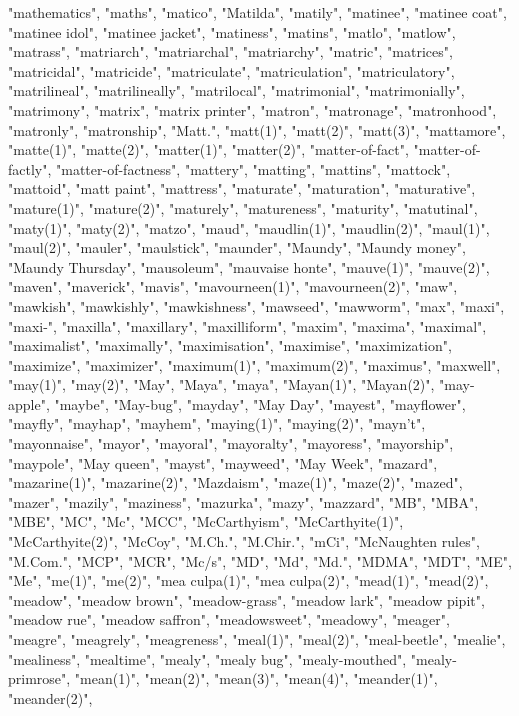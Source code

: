 "mathematics",
"maths",
"matico",
"Matilda",
"matily",
"matinee",
"matinee coat",
"matinee idol",
"matinee jacket",
"matiness",
"matins",
"matlo",
"matlow",
"matrass",
"matriarch",
"matriarchal",
"matriarchy",
"matric",
"matrices",
"matricidal",
"matricide",
"matriculate",
"matriculation",
"matriculatory",
"matrilineal",
"matrilineally",
"matrilocal",
"matrimonial",
"matrimonially",
"matrimony",
"matrix",
"matrix printer",
"matron",
"matronage",
"matronhood",
"matronly",
"matronship",
"Matt.",
"matt(1)",
"matt(2)",
"matt(3)",
"mattamore",
"matte(1)",
"matte(2)",
"matter(1)",
"matter(2)",
"matter-of-fact",
"matter-of-factly",
"matter-of-factness",
"mattery",
"matting",
"mattins",
"mattock",
"mattoid",
"matt paint",
"mattress",
"maturate",
"maturation",
"maturative",
"mature(1)",
"mature(2)",
"maturely",
"matureness",
"maturity",
"matutinal",
"maty(1)",
"maty(2)",
"matzo",
"maud",
"maudlin(1)",
"maudlin(2)",
"maul(1)",
"maul(2)",
"mauler",
"maulstick",
"maunder",
"Maundy",
"Maundy money",
"Maundy Thursday",
"mausoleum",
"mauvaise honte",
"mauve(1)",
"mauve(2)",
"maven",
"maverick",
"mavis",
"mavourneen(1)",
"mavourneen(2)",
"maw",
"mawkish",
"mawkishly",
"mawkishness",
"mawseed",
"mawworm",
"max",
"maxi",
"maxi-",
"maxilla",
"maxillary",
"maxilliform",
"maxim",
"maxima",
"maximal",
"maximalist",
"maximally",
"maximisation",
"maximise",
"maximization",
"maximize",
"maximizer",
"maximum(1)",
"maximum(2)",
"maximus",
"maxwell",
"may(1)",
"may(2)",
"May",
"Maya",
"maya",
"Mayan(1)",
"Mayan(2)",
"may-apple",
"maybe",
"May-bug",
"mayday",
"May Day",
"mayest",
"mayflower",
"mayfly",
"mayhap",
"mayhem",
"maying(1)",
"maying(2)",
"mayn't",
"mayonnaise",
"mayor",
"mayoral",
"mayoralty",
"mayoress",
"mayorship",
"maypole",
"May queen",
"mayst",
"mayweed",
"May Week",
"mazard",
"mazarine(1)",
"mazarine(2)",
"Mazdaism",
"maze(1)",
"maze(2)",
"mazed",
"mazer",
"mazily",
"maziness",
"mazurka",
"mazy",
"mazzard",
"MB",
"MBA",
"MBE",
"MC",
"Mc",
"MCC",
"McCarthyism",
"McCarthyite(1)",
"McCarthyite(2)",
"McCoy",
"M.Ch.",
"M.Chir.",
"mCi",
"McNaughten rules",
"M.Com.",
"MCP",
"MCR",
"Mc/s",
"MD",
"Md",
"Md.",
"MDMA",
"MDT",
"ME",
"Me",
"me(1)",
"me(2)",
"mea culpa(1)",
"mea culpa(2)",
"mead(1)",
"mead(2)",
"meadow",
"meadow brown",
"meadow-grass",
"meadow lark",
"meadow pipit",
"meadow rue",
"meadow saffron",
"meadowsweet",
"meadowy",
"meager",
"meagre",
"meagrely",
"meagreness",
"meal(1)",
"meal(2)",
"meal-beetle",
"mealie",
"mealiness",
"mealtime",
"mealy",
"mealy bug",
"mealy-mouthed",
"mealy-primrose",
"mean(1)",
"mean(2)",
"mean(3)",
"mean(4)",
"meander(1)",
"meander(2)",
